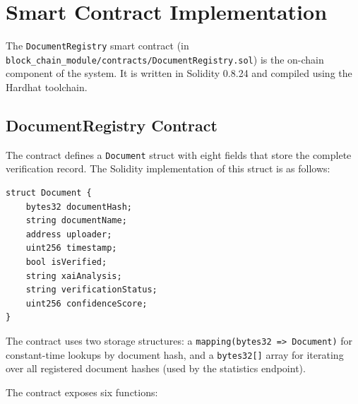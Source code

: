 \section{Smart Contract Implementation}

The \texttt{DocumentRegistry} smart contract (in \texttt{block\_chain\_module/contracts/DocumentRegistry.sol}) is the on-chain component of the system. It is written in Solidity 0.8.24 and compiled using the Hardhat toolchain.

\subsection{DocumentRegistry Contract}

The contract defines a \texttt{Document} struct with eight fields that store the complete verification record. The Solidity implementation of this struct is as follows:

\begin{verbatim}
struct Document {
    bytes32 documentHash;
    string documentName;
    address uploader;
    uint256 timestamp;
    bool isVerified;
    string xaiAnalysis;
    string verificationStatus;
    uint256 confidenceScore;
}
\end{verbatim}

The contract uses two storage structures: a \texttt{mapping(bytes32 => Document)} for constant-time lookups by document hash, and a \texttt{bytes32[]} array for iterating over all registered document hashes (used by the statistics endpoint).

The contract exposes six functions:


